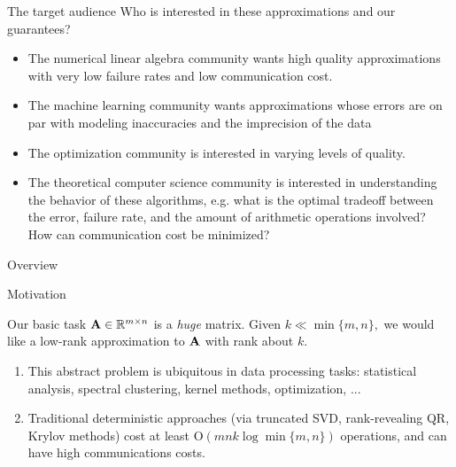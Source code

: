 \documentclass[xcolor=x11names,compress,ignorenonframetext,10pt]{beamer}
\renewcommand{\(}{\begin{columns}}
\renewcommand{\)}{\end{columns}}
\newcommand{\<}[1]{\begin{column}{#1}}
\renewcommand{\>}{\end{column}}
\begin{document}
 \begin{frame}{The target audience}
  Who is interested in these approximations and our guarantees?
  \begin{itemize}
   \item The {\color{dgreen} numerical linear algebra community} wants high quality approximations
   with very low failure rates and low communication cost.
   \item The {\color{dgreen} machine learning community} wants approximations whose errors are on par
   with modeling inaccuracies and the imprecision of the data
   \item The {\color{dgreen} optimization community} is interested in varying levels of quality.
   \item The {\color{dgreen} theoretical computer science community} is interested in understanding the
   behavior of these algorithms, e.g. what is the optimal tradeoff between the error, failure rate,
   and the amount of arithmetic operations involved? How can communication cost be minimized?
  \end{itemize}
 \end{frame}

\begin{frame}{Overview}
 \tableofcontents
\end{frame}

\begin{frame}{Motivation}
 \begin{block}{Our basic task}
  $\mathbf{A} \in \mathbb{R}^{m \times n}$ is a \emph{huge} matrix. Given $k \ll \min\{m,n\},$ we
  would like a low-rank approximation to $\mathbf{A}$ with rank about $k$.
 \end{block}

 \begin{enumerate}
  \item This abstract problem is ubiquitous in data processing tasks: statistical analysis, spectral clustering,
  kernel methods, optimization, ...
  \item Traditional deterministic approaches (via truncated SVD, rank-revealing QR, Krylov methods)
  cost at least $\mathrm{O}(mnk\log \min\{m, n\})$ operations, and can have high communications costs.
 \end{enumerate}

\end{frame}
\end{document}
